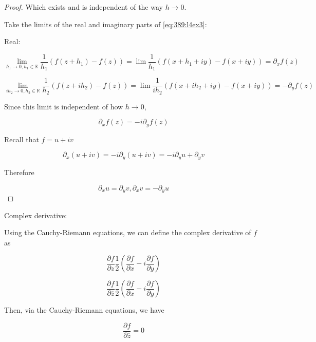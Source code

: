 \documentclass[../notes.tex]{subfiles}
\begin{document}
\begin{theorem}
\begin{proof}
		Which exists and is independent of the way $ h \to 0 $.

		Take the limits of the real and imaginary parts of \eqref{eq:389:l4ex3}:

		Real:

		\begin{equation}
			\lim_{h_1 \to 0, h_1 \in \mathbb{R}} \frac{1}{h_1} (f(z+h_1) - f(z))  = \lim \frac{1}{h_1}(f(x+h_1+iy) - f(x+iy)) = \partial_x f(z)
		\end{equation}

		\begin{equation}
			\lim_{ih_2 \to 0, h_2 \in \mathbb{R}} \frac{1}{h_2} (f(z+ih_2) - f(z))  = \lim \frac{1}{ih_2}(f(x+ih_2+iy) - f(x+iy)) = - \partial_y f(z)
		\end{equation}

		Since this limit is independent of how $ h \to 0 $, 

		\begin{equation}
			\partial_x f(z) = - i\partial_y f(z)
		\end{equation}

		Recall that $  f = u + iv$


		\begin{equation}
			\partial_x (u+iv) = - i\partial_y (u+iv) = -i \partial_y u + \partial_y v
		\end{equation}

		Therefore

		\begin{equation}
			\partial_x u = \partial_y v, \partial_x v = - \partial_y u
			\label{eq:389:cauchy_reinmann}
		\end{equation}
		
	\end{proof}
	
	
	


\end{theorem}



\begin{definition}
	Complex derivative:

	Using the Cauchy-Riemann equations, we can define the complex derivative of $ f $  as

	\begin{equation}
		\frac{\partial f}{\partial z} \frac{1}{2}(\frac{\partial f}{\partial x}  - i\frac{\partial f}{\partial y})
	\end{equation}
	
	\begin{equation}
		\frac{\partial f}{\partial \overline{z}} \frac{1}{2}(\frac{\partial f}{\partial x}  - i\frac{\partial f}{\partial y})
	\end{equation}

	Then, via the Cauchy-Riemann equations, we have

	\begin{equation}
		\frac{\partial f}{\partial \overline{z}}  = 0
	 \label{eq:389:l4ex5}
	\end{equation}
	

\end{definition}
\end{document}
